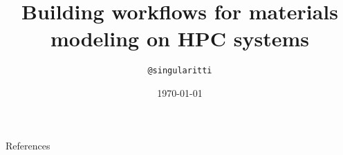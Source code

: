\documentclass[aspectratio=1610]{beamer}
\title{Building workflows for materials modeling on HPC systems}
\subtitle{}
\author{\texttt{@singularitti}}
\institute{}
\date{\today}
\begin{document}
\begin{frame}
    \maketitle
\end{frame}



\begin{frame}{References}
    \printbibliography
\end{frame}
\end{document}
